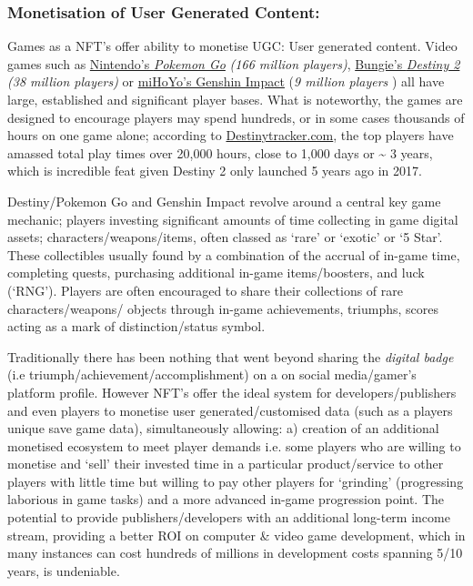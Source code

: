 \subsubsection{Monetisation of User Generated Content:} Games as a NFT's
  offer ability to monetise UGC: User generated content. Video games such as
\href{https://www.businessofapps.com/data/pokemon-go-statistics/}{Nintendo's
\emph{Pokemon Go}} \emph{(166 million players)},
\href{https://techacake.com/destiny-2-player-count/\#:~:text=The\%20total\%20player\%20base\%20of,to\%20be\%2038\%20million\%20players.\&text=According\%20to\%20the\%20source\%2C\%20the,in\%20terms\%20of\%20player\%20population.}{Bungie's
\emph{Destiny 2}} \emph{(38 million players)} or
\href{https://fictionhorizon.com/how-many-people-play-genshin-impact/\#:~:text=Genshin\%20Impact\%20had\%20approximately\%209,million\%20users\%20in\%20June\%202021.}{miHoYo's
Genshin Impact} (\emph{9 million players} ) all have large, established
and significant player bases. What is noteworthy, the games are designed
to encourage players may spend hundreds, or in some cases thousands of
hours on one game alone; according to
\href{https://destinytracker.com/destiny/leaderboards/all/minutesplayedtotal?grouped=true\&page=1}{Destinytracker.com},
the top players have amassed total play times over 20,000 hours, close
to 1,000 days or \textasciitilde{} 3 years, which is incredible feat
given Destiny 2 only launched 5 years ago in 2017.\par
Destiny/Pokemon Go and Genshin Impact revolve around a central key game
mechanic; players investing significant amounts of time collecting in
game digital assets; characters/weapons/items, often classed as `rare'
or `exotic' or `5 Star'. These collectibles usually found by a
combination of the accrual of in-game time, completing quests,
purchasing additional in-game items/boosters, and luck (`RNG'). Players
are often encouraged to share their collections of rare
characters/weapons/ objects through in-game achievements, triumphs,
scores acting as a mark of distinction/status symbol.\par
Traditionally there has been nothing that went beyond sharing the
\emph{digital badge} (i.e triumph/achievement/accomplishment) on a on
social media/gamer's platform profile. However NFT's offer the ideal
system for developers/publishers and even players to monetise user
generated/customised data (such as a players unique save game data), simultaneously allowing:
a) creation of an additional monetised ecosystem to meet player demands
i.e. some players who are willing to monetise and `sell' their invested
time in a particular product/service to other players with little time
but willing to pay other players for `grinding' (progressing laborious
in game tasks) and a more advanced in-game progression point.
The potential to provide publishers/developers with an additional
long-term income stream, providing a better ROI on computer \& video
game development, which in many instances can cost hundreds of millions
in development costs spanning 5/10 years, is undeniable.
